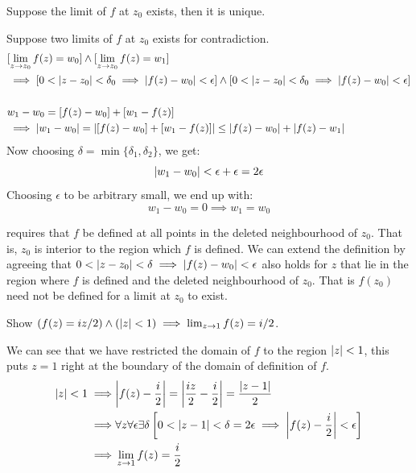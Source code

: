 \documentclass[12pt, english]{book}
\makeatletter
\renewenvironment{proof}[1][\proofname]{\par
	\pushQED{\qed}%
	\normalfont \topsep6\p@\@plus6\p@\relax
	\list{}{%
		\settowidth{\leftmargin}{\itshape\proofname:\hskip\labelsep}%
		\setlength{\labelwidth}{0pt}%
		\setlength{\itemindent}{-\leftmargin}%
	}%
	\item[\hskip\labelsep\itshape#1\@addpunct{:}]\ignorespaces
	}{ \popQED\endlist\@endpefalse}
\makeatother
\begin{document}
	\begin{theorem} 
		\label{Uniqueness of Limits Theorem - Complex}
		Suppose the limit of $f$ at $z_0$ exists, then it is unique.
	\end{theorem}
	\begin{proof}
		Suppose two limits of $f$ at $z_0$ exists for contradiction.
		\begin{align*}
			&[\lim_{z \rightarrow z_0} f(z) = w_0] \land [\lim_{z \rightarrow z_0} f(z) = w_1] \\
			&\implies [0 < \abs{z - z_0} < \delta_0 \implies \abs{f(z) - w_0} < \epsilon] 
				\land [0 < \abs{z - z_0} < \delta_0 \implies \abs{f(z) - w_0} < \epsilon] \\
			\\
			&w_1 - w_0 = [f(z) - w_0] + [w_1 - f(z)]\\
			&\implies \abs{w_1 - w_0} = \abs{[f(z) - w_0] + [w_1 - f(z)]} 
				\leq \abs{f(z) - w_0} + \abs{f(z) - w_1} 
		\end{align*}
		Now choosing $\delta = \min\{\delta_1, \delta_2\}$, we get:
		$$\abs{w_1 - w_0} < \epsilon + \epsilon = 2 \epsilon$$
		Choosing $\epsilon$ to be arbitrary small, we end up with: 
		$$w_1 - w_0 = 0 \implies w_1 = w_0$$
	\end{proof}

	 requires that $f$ be defined at all points in the deleted neighbourhood of $z_0$. That is, $z_0$ is interior to the region which $f$ is defined. We can extend the definition by agreeing that $0<\abs{z-z_0} < \delta \implies \abs{f(z) - w_0} < \epsilon$ also holds for $z$ that lie in the region where $f$ is defined and the deleted neighbourhood of $z_0$.  That is $f(z_0)$ need not be defined for a limit at $z_0$ to exist.
	
	\begin{example}
		Show $(f(z) = iz/2) \land (\abs{z} < 1) \implies \lim_{z\rightarrow 1} f(z) = i/2$.
		
		We can see that we have restricted the domain of $f$ to the region $\abs{z} < 1$, this puts $z = 1$ right at the boundary of the domain of definition of $f$.
		\begin{align*}
			\abs{z} < 1 \implies& \abs{f(z) - \frac{i}{2}} = \abs{\frac{iz}{2} - \frac{i}{2}} = \frac{\abs{z - 1}}{2} \\
			\implies& \forall z \forall \epsilon \exists \delta \left[ 0 < \abs{z - 1} < \delta = 2\epsilon \implies \abs{f(z) - \frac{i}{2}} < \epsilon \right] \\
			\implies& \lim_{z \rightarrow 1} f(z) = \frac{i}{2}
		\end{align*}
	\end{example}
	
\end{document}
